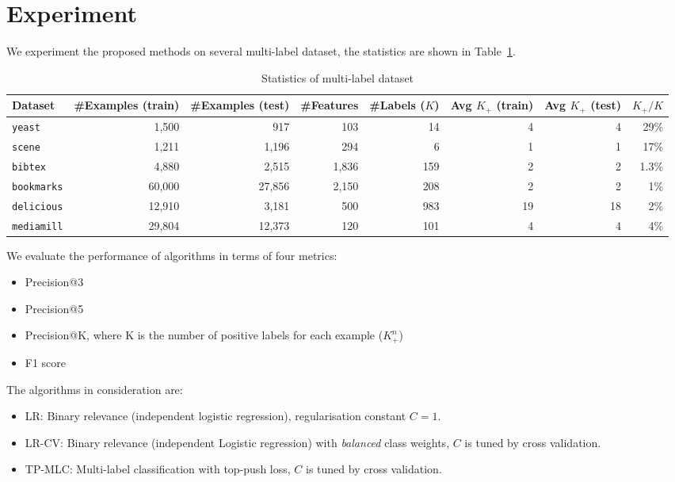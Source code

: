 \section{Experiment}
\label{sec:experiment}

We experiment the proposed methods on several multi-label dataset, the statistics are shown in Table~\ref{tab:dataset}.

\begin{table}[!h]
\centering
\caption{Statistics of multi-label dataset}
\label{tab:dataset}
\begin{tabular}{l*{7}{r}} \hline \hline
Dataset & \#Examples (train) & \#Examples (test) & \#Features & \#Labels ($K$) & Avg $K_+$ (train) & Avg $K_+$ (test) & $K_+ / K$ \\ \hline
\texttt{yeast}     & 1,500  & 917    & 103  & 14  & 4  & 4  & 29\%  \\
\texttt{scene}     & 1,211  & 1,196  & 294  & 6   & 1  & 1  & 17\%  \\ 
\texttt{bibtex}    & 4,880  & 2,515  & 1,836 & 159 & 2  & 2  & 1.3\% \\
\texttt{bookmarks} & 60,000 & 27,856 & 2,150 & 208 & 2  & 2  & 1\%   \\
\texttt{delicious} & 12,910 & 3,181  & 500  & 983 & 19 & 18 & 2\%   \\
\texttt{mediamill} & 29,804 & 12,373 & 120  & 101 & 4  & 4  & 4\%   \\
\hline
\end{tabular}
\end{table}

\noindent
We evaluate the performance of algorithms in terms of four metrics:
\begin{itemize}
\item Precision@3
\item Precision@5
\item Precision@K, where K is the number of positive labels for each example (\ie $K_+^n$)
\item F1 score
\end{itemize}

\noindent
The algorithms in consideration are:
\begin{itemize}
\item LR: Binary relevance (\ie independent logistic regression), regularisation constant $C = 1$.
\item LR-CV: Binary relevance (\ie independent Logistic regression) with \emph{balanced} class weights, $C$ is tuned by cross validation.
\item TP-MLC: Multi-label classification with top-push loss, $C$ is tuned by cross validation.
\end{itemize}

